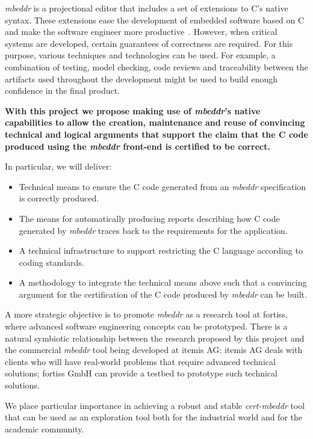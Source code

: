 \emph{mbeddr} is a projectional editor that includes a set of extensions to C's
native syntax. These extensions ease the development of embedded software based
on C and make the software engineer more
productive~\cite{VoelterRKS13}.
However, when critical systems are developed, certain guarantees of correctness
are required. For this purpose, various techniques and technologies
can be used. For example, a combination of testing, model checking, code
reviews and traceability between the artifacts used throughout the development
might be used to build enough confidence in the final product.

\vspace{2mm}
\noindent
\textbf{With this project we propose making use of \emph{mbeddr}'s native capabilities
to allow the creation, maintenance and reuse of convincing technical and logical
arguments that support the claim that the C code produced using the
\emph{mbeddr} front-end is certified to be correct.} 
\vspace{2mm}
\noindent

In particular, we will deliver:
\begin{itemize}
  \item Technical means to ensure the C code generated from an \emph{mbeddr}
  specification is correctly produced.
  \item The means for automatically producing reports describing how
   C code generated by \emph{mbeddr} traces back to the requirements for the
   application.
\item A technical infrastructure to support restricting the C language according
to coding standards.
\item A methodology to integrate the technical means above such that a
convincing argument for the certification of the C code produced by \emph{mbeddr} can be built.
\end{itemize}

A more strategic objective is to promote \emph{mbeddr} as a research tool
at fortiss, where advanced software engineering concepts can be prototyped.
There is a natural symbiotic relationship between the research proposed by this project and
the commercial \emph{mbeddr} tool being developed at itemis AG:
itemis AG deals with clients who will have real-world problems that require
advanced technical solutions; fortiss GmbH can provide a testbed to prototype
such technical solutions.
% 

We place particular importance in achieving a robust and stable
\emph{cert-mbeddr} tool that can be used as an exploration tool both for
the industrial world and for the academic community.